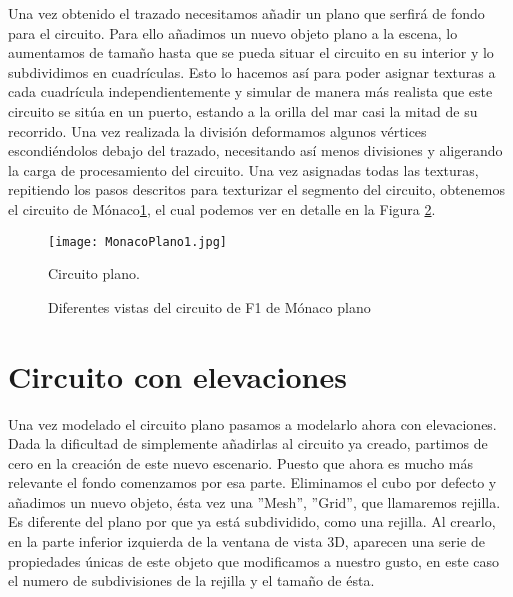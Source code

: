 Una vez obtenido el trazado necesitamos añadir un plano que serfirá de fondo para el circuito. Para ello añadimos un nuevo objeto plano a la escena, lo aumentamos de tamaño hasta que se pueda situar el circuito en su interior y lo subdividimos en cuadrículas. Esto lo hacemos así para poder asignar texturas a cada cuadrícula independientemente y simular de manera más realista que este circuito se sitúa en un puerto, estando a la orilla del mar casi la mitad de su recorrido. Una vez realizada la división deformamos algunos vértices escondiéndolos debajo del trazado, necesitando así menos divisiones y aligerando la carga de procesamiento del circuito. Una vez asignadas todas las texturas, repitiendo los pasos descritos para texturizar el segmento del circuito, obtenemos el circuito de Mónaco\ref{fig:monacoplano1}, el cual podemos ver en detalle en la Figura \ref{fig:monacoplanovistas}.

\begin{figure}[t]
	\centering
	\texttt{[image: MonacoPlano1.jpg]}
	\caption{Circuito plano.} \label{fig:monacoplano1}
\end{figure}

\begin{figure}
	\centering
	\hspace{0.04\textwidth}	
	\vspace{0.03\textwidth}
	\hspace{0.04\textwidth}
	\caption{Diferentes vistas del circuito de F1 de Mónaco plano} \label{fig:monacoplanovistas}
\end{figure}


\section{Circuito con elevaciones}
\label{sec:pm_circuitoconelevaciones}

Una vez modelado el circuito plano pasamos a modelarlo ahora con elevaciones. Dada la dificultad de simplemente añadirlas al circuito ya creado, partimos de cero en la creación de este nuevo escenario. Puesto que ahora es mucho más relevante el fondo comenzamos por esa parte. Eliminamos el cubo por defecto y añadimos un nuevo objeto, ésta vez una ”Mesh”, ”Grid”, que llamaremos rejilla. Es diferente del plano por que ya está subdividido, como una rejilla. Al crearlo, en la parte inferior izquierda de la ventana de vista 3D, aparecen una serie de propiedades únicas de este objeto que modificamos a nuestro gusto, en este caso el numero de subdivisiones de la rejilla y el tamaño de ésta.

